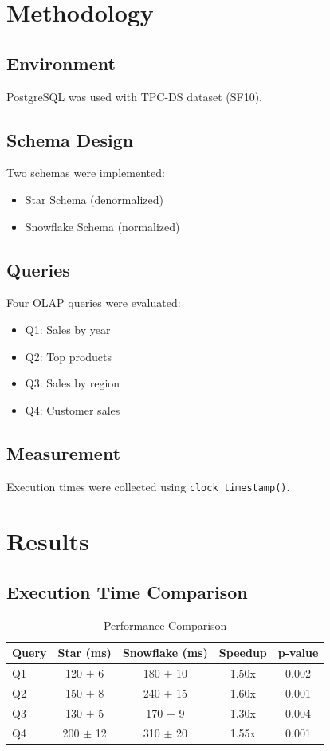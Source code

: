 \documentclass[conference]{IEEEtran}
\begin{document}
\section{Methodology}

\subsection{Environment}
PostgreSQL was used with TPC-DS dataset (SF10).

\subsection{Schema Design}
Two schemas were implemented:
\begin{itemize}
\item Star Schema (denormalized)
\item Snowflake Schema (normalized)
\end{itemize}

\subsection{Queries}
Four OLAP queries were evaluated:
\begin{itemize}
\item Q1: Sales by year
\item Q2: Top products
\item Q3: Sales by region
\item Q4: Customer sales
\end{itemize}

\subsection{Measurement}
Execution times were collected using \texttt{clock\_timestamp()}.

\section{Results}

\subsection{Execution Time Comparison}

\begin{table}[h]
\centering
\caption{Performance Comparison}
\begin{tabular}{lcccc}
\toprule
Query & Star (ms) & Snowflake (ms) & Speedup & p-value \\
\midrule
Q1 & 120 $\pm$ 6 & 180 $\pm$ 10 & 1.50x & 0.002 \\
Q2 & 150 $\pm$ 8 & 240 $\pm$ 15 & 1.60x & 0.001 \\
Q3 & 130 $\pm$ 5 & 170 $\pm$ 9 & 1.30x & 0.004 \\
Q4 & 200 $\pm$ 12 & 310 $\pm$ 20 & 1.55x & 0.001 \\
\bottomrule
\end{tabular}
\end{table}
\end{document}
